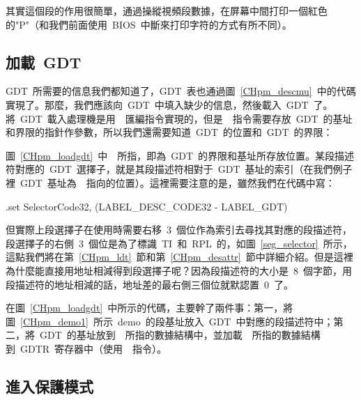 \label{CHpm_demo1}

其實這個段的作用很簡單，通過操縱視頻段數據，在屏幕中間打印一個紅色的"P"（和我們前面使用~BIOS~中斷來打印字符的方式有所不同）。

\subsection{加載~GDT} \label{CHpm_secloadgdt}

GDT~所需要的信息我們都知道了，GDT~表也通過圖~\ref{CHpm_descmu}~中的代碼實現了。那麼，我們應該向~GDT~中填入缺少的信息，然後載入~GDT~了。將~GDT~載入處理機是用~~匯編指令實現的，但是~~指令需要存放~GDT~的基址和界限的指針作參數，所以我們還需要知道~GDT~的位置和~GDT~的界限：

\label{CHpm_loadgdt}

圖~\ref{CHpm_loadgdt}~中~~所指，即為~GDT~的界限和基址所存放位置。某段描述符對應的~GDT~選擇子，就是其段描述符相對于~GDT~基址的索引（在我們例子裡~GDT~基址為~~指向的位置）。這裡需要注意的是，雖然我們在代碼中寫：

\begin{Command}
.set SelectorCode32, (LABEL_DESC_CODE32 - LABEL_GDT)
\end{Command}
但實際上段選擇子在使用時需要右移~3~個位作為索引去尋找其對應的段描述符，段選擇子的右側~3~個位是為了標識~TI~和~RPL~的，如圖~\ref{seg_selector}~所示，這點我們將在第~\ref{CHpm_ldt}~節和第~\ref{CHpm_desattr}~節中詳細介紹。但是這裡為什麼能直接用地址相減得到段選擇子呢？因為段描述符的大小是~8~個字節，用段描述符的地址相減的話，地址差的最右側三個位就默認置~0~了。

在圖~\ref{CHpm_loadgdt}~中所示的代碼，主要幹了兩件事：第一，將圖~\ref{CHpm_demo1}~所示~demo~的段基址放入~GDT~中對應的段描述符中；第二，將~GDT~的基址放到~~所指的數據結構中，並加載~~所指的數據結構到~GDTR~寄存器中（使用~~指令）。

\subsection{進入保護模式}

